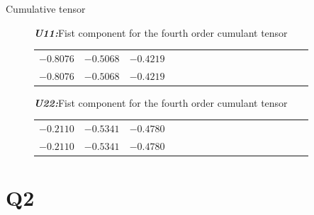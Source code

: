 \documentclass[t,12pt,english
\ifx\beamermode\undefined\else,\beamermode\fi
]{beamer}
\begin{document}
\begin{frame}{Cumulative tensor}
\begin{figure}[!htb]
  \begin{table}[!htbp]
\tiny\centering
\tiny{\textbf{\textit{U11:}}Fist component for the fourth order cumulant tensor}\\
\begin{tabular}{c c c c c c c c c c c c c c c c c} 
  \hline  
   $-0.8076$&$-0.5068$&$-0.4219$\\
   $-0.8076$&$-0.5068$&$-0.4219$\\
 \hline
\end{tabular}
\end{table}


\endminipage
{}
\centering
  \begin{table}[!htbp]
\tiny\centering
\tiny{\textbf{\textit{U22:}}Fist component for the fourth order cumulant tensor}\\
\begin{tabular}{c c c c c c c c c c c c c c c c c} 
  \hline  
   $-0.2110$&$-0.5341$&$-0.4780$\\
   $-0.2110$&$-0.5341$&$-0.4780$\\
   
 \hline
\end{tabular}
\end{table}


\endminipage
\end{figure}

\end{frame}

\section{Q2}
\end{document}
